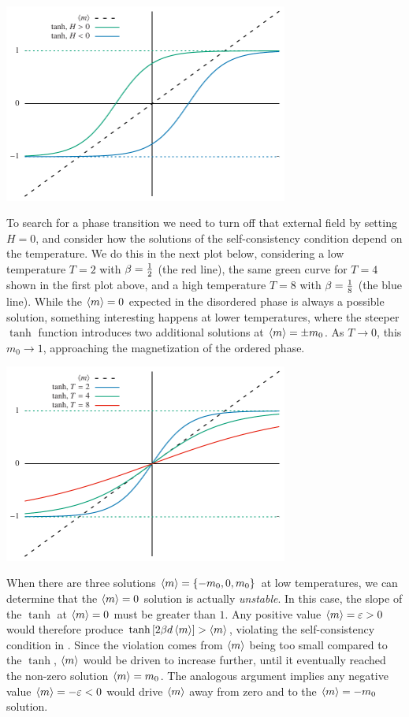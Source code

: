 \begin{center}\includegraphics[width=0.7\textwidth]{figs/week10_consistency_H-beta.pdf}\end{center}

To search for a phase transition we need to turn off that external field by setting $H = 0$, and consider how the solutions of the self-consistency condition depend on the temperature.
We do this in the next plot below, considering a low temperature $T = 2$ with $\beta = \frac{1}{2}$ (the red line), the same green curve for $T = 4$ shown in the first plot above, and a high temperature $T = 8$ with $\beta = \frac{1}{8}$ (the blue line).
While the $\left\langle m \right\rangle = 0$ expected in the disordered phase is always a possible solution, something interesting happens at lower temperatures, where the steeper $\tanh$ function introduces two additional solutions at $\left\langle m \right\rangle = \pm m_0$.
As $T \to 0$, this $m_0 \to 1$, approaching the magnetization of the ordered phase.

\begin{center}\includegraphics[width=0.7\textwidth]{figs/week10_consistency_beta.pdf}\end{center}

When there are three solutions $\left\langle m \right\rangle = \left\{-m_0, 0, m_0\right\}$ at low temperatures, we can determine that the $\left\langle m \right\rangle = 0$ solution is actually \textit{unstable}.
In this case, the slope of the $\tanh$ at $\left\langle m \right\rangle = 0$ must be greater than $1$.
Any positive value $\left\langle m \right\rangle = \varepsilon > 0$ would therefore produce $\tanh\left[2\beta d\left\langle m \right\rangle\right] > \left\langle m \right\rangle$, violating the self-consistency condition in .
Since the violation comes from $\left\langle m \right\rangle$ being too small compared to the $\tanh$, $\left\langle m \right\rangle$ would be driven to increase further, until it eventually reached the non-zero solution $\left\langle m \right\rangle = m_0$.
The analogous argument implies any negative value $\left\langle m \right\rangle = -\varepsilon < 0$ would drive $\left\langle m \right\rangle$ away from zero and to the $\left\langle m \right\rangle = -m_0$ solution.


